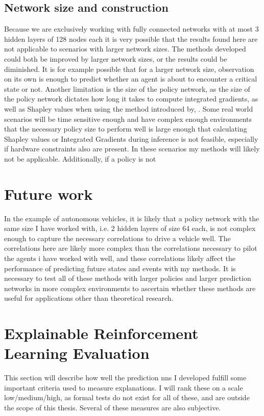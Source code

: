 \documentclass[UKenglish]{uiomasterthesis}
\begin{document}
\subsection{Network size and construction}
Because we are exclusively working with fully connected networks with at most 3 hidden layers of 128 nodes each it is very possible that the results found here are not applicable to scenarios with larger network sizes. The methods developed could both be improved by larger network sizes, or the results could be diminished. It is for example possible that for a larger network size, observation on its own is enough to predict whether an agent is about to encounter a critical state or not. 
Another limitation is the size of the policy network, as the size of the policy network dictates how long it takes to compute integrated gradients, as well as Shapley values when using the method introduced by,  . Some real world scenarios will be time sensitive enough and have complex enough environments that the necessary policy size to perform well is large enough that calculating Shapley values or Integrated Gradients during inference is not feasible, especially if hardware constraints also are present. In these scenarios my methods will likely not be applicable.
Additionally, if a policy is not

\section{Future work}
In the example of autonomous vehicles, it is likely that a policy network with the same size I have worked with, i.e. 2 hidden layers of size 64 each, is not complex enough to capture the necessary correlations to drive a vehicle well. The correlations here are likely more complex than the correlations necessary to pilot the agents i have worked with well, and these correlations likely affect the performance of predicting future states and events with my methods. It is necessary to test all of these methods with larger policies and larger prediction networks in more complex environments to ascertain whether these methods are useful for applications other than theoretical research. 

\section{Explainable Reinforcement Learning Evaluation}
This section will describe how well the prediction \acp{nn} I developed fulfill some important criteria used to measure explanations. I will rank these on a scale low/medium/high, as formal tests do not exist for all of these, and are outside the scope of this thesis. Several of these measures are also subjective.
\end{document}
